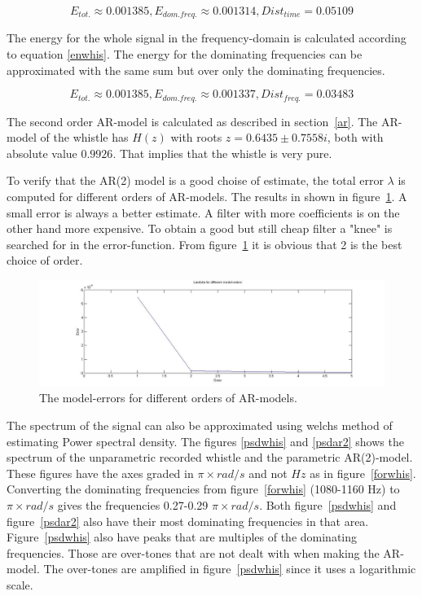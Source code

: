 \documentclass[12pt]{article}
\begin{document}
\begin{equation}
E_{tot.} \approx 0.001385, E_{dom. freq.}\approx 0.001314, Dist_{time} = 0.05109
\end{equation}

The energy for the whole signal in the frequency-domain is calculated according to equation \ref{enwhis}. The energy for the dominating frequencies can be approximated with the same sum but over only the dominating frequencies. 

\begin{equation}
E_{tot.} \approx 0.001385, E_{dom. freq.}\approx 0.001337, Dist_{freq.} = 0.03483
\end{equation}



The second order AR-model is calculated as described in section~\ref{ar}.  The AR-model of the whistle has $H(z)$ with roots $z=0.6435 \pm 0.7558i$, both with absolute value $0.9926$. That implies that the whistle is very pure. 

To verify that the AR(2) model is a good choise of estimate, the total error $\lambda$ is computed for different orders of AR-models. The results in shown in figure~\ref{whisknee}. A small error is always  a better estimate. A filter with more coefficients is on the other hand more expensive. To obtain a good but still cheap filter a "knee" is searched for in the error-function. From figure~\ref{whisknee} it is obvious that 2 is the best choice of order.   

\begin{figure}[H]
\centering
\includegraphics[width=14cm]{whistleknee.jpg}
\caption{The model-errors for different orders of AR-models.\label{whisknee}}
\end{figure}

The spectrum of the signal can also be approximated using welchs method of estimating Power spectral density. The figures \ref{psdwhis} and \ref{psdar2} shows the spectrum of the unparametric recorded whistle and the parametric AR(2)-model. These figures have the axes graded in $\pi \times rad/s$ and not $Hz$ as in figure~\ref{forwhis}. Converting the dominating frequencies from figure~\ref{forwhis} (1080-1160 Hz) to $\pi \times rad/s$ gives the frequencies 0.27-0.29 $\pi \times rad/s$. Both figure~\ref{psdwhis} and figure~\ref{psdar2} also have their most dominating frequencies in that area. Figure~\ref{psdwhis} also have peaks that are multiples of the dominating frequencies. Those are over-tones that are not dealt with when making the AR-model. The over-tones are amplified in figure~\ref{psdwhis} since it uses a logarithmic scale. 
\end{document}
